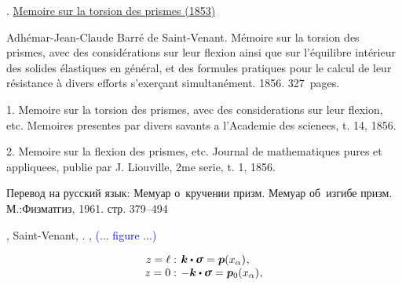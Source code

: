 
\label{para:twistingofrods.saintvenant}

\begin{otherlanguage}{russian}

{\small
{}. \href{https://babel.hathitrust.org/cgi/pt?id=hvd.32044091959866&seq=7}{Memoire sur la torsion des prismes (1853)}

Adhémar-Jean-Claude Barré de Saint\hbox{-\hspace{-0.2ex}}Venant.
Mémoire sur la torsion des prismes, avec des considérations sur leur flexion ainsi que sur l'équilibre intérieur des solides élastiques en général, et des formules pratiques pour le calcul de leur résistance à divers efforts s’exerçant simultanément.
1856.
327~pages.

1. Memoire sur la torsion des prismes, avec des considerations sur leur flexion, etc. Memoires presentes par divers savants a l'Academie des scienees, t. 14, 1856.

2. Memoire sur la flexion des prismes, etc. Journal de mathematiques pures et appliquees, publie par J. Liouville, 2me serie, t. 1, 1856.

Перевод на русский язык:
 Мемуар о~кручении призм. Мемуар об~изгибе призм. М.:\;Физ\-мат\-гиз, 1961.
стр. 379--494
\par}

\end{otherlanguage}

,  Saint\hbox{-\hspace{-0.2ex}}Venant,   .
  ,     \textcolor{blue}{(... figure ...)}

\nopagebreak\vspace{-0.2em}\begin{equation*}
\begin{array}{r@{\hspace{.4em}}l}
z=\ell:&
\bm{k} \dotp \linearstress = \bm{p}(x_{\alpha})
\hspace{.1ex} ,
\\
z=0:&
- \bm{k} \dotp \linearstress = \bm{p}_{0}(x_{\alpha})
\hspace{.1ex} ,
\end{array}
\end{equation*}

